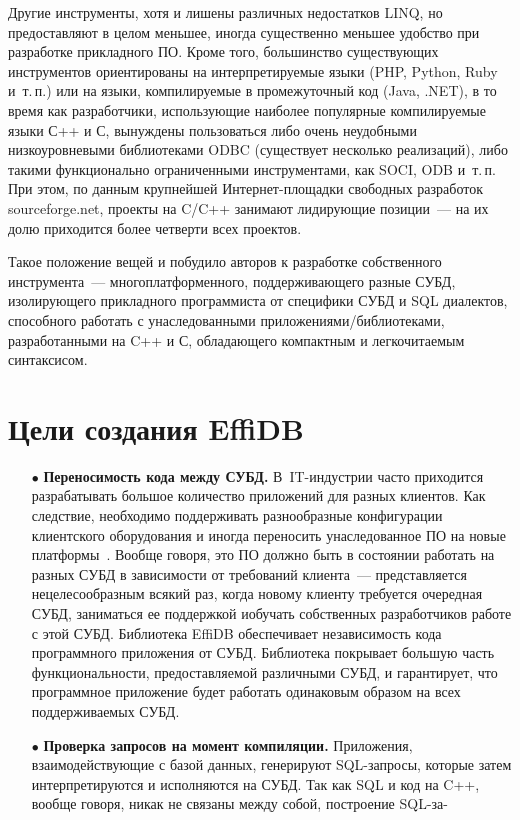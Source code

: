 \begin{multicols}{2}
Другие инструменты, хотя и лишены различных недостатков LINQ, но предоставляют в 
целом меньшее, иногда существенно меньшее удобство при разработке прикладного ПО. 
Кроме того, большинство существующих инструментов ориентированы на 
интерпретируемые языки (PHP, Python, Ruby и~т.\,п.) или на языки, компилируемые в 
промежуточный код (Java, .NET), в то время как разработчики, использующие наиболее 
популярные компилируемые языки С++ и С, вынуждены пользоваться либо очень 
неудобными низкоуровневыми библиотеками ODBC (существует несколько реализаций), 
либо такими функционально ограниченными инструментами, как SOCI, ODB и~т.\,п. При 
этом, по данным крупнейшей Интернет-площадки свободных разработок sourceforge.net, 
проекты на C/C++ занимают лидирующие позиции~--- на их долю приходится более 
четверти всех проектов.

Такое положение вещей и побудило авторов к разработке собственного инструмента~--- 
многоплатформенного, поддерживающего разные СУБД, изолирующего прикладного 
программиста от специфики СУБД и SQL диалектов, способного работать с 
унаследованными приложениями/библиотеками, разработанными на C++ и С, 
обладающего компактным и легкочитаемым синтаксисом. 

\vspace*{-9pt}

\section{Цели создания EffiDB}

\vspace*{-2pt}

\noindent
\begin{itemize}
\item[$\bullet$] \textbf{Переносимость кода между СУБД.} В~IT-ин\-ду\-ст\-рии 
часто приходится разрабатывать большое количество приложений для разных 
клиентов. Как следствие, необходимо поддерживать разнообразные конфигурации 
клиентского оборудования и иногда переносить унаследованное 
ПО на новые платформы~\cite{1-y, 2-y}. Вообще говоря, это 
ПО должно быть в состоянии работать на\linebreak
 разных СУБД в зависимости от 
требований клиента~--- представляется нецелесообразным всякий раз, когда новому 
клиенту требуется очередная СУБД, заниматься ее поддержкой и\linebreak \mbox{обучать} собственных 
разработчиков работе с этой СУБД. Библиотека EffiDB обес\-пе\-чивает независимость 
кода программного приложения от СУБД. Библиотека покрывает\linebreak
 большую часть 
функциональности, пред\-остав\-ля\-емой различными СУБД, и гарантирует, что 
про\-грам\-мное приложение будет работать одинаковым образом на всех 
поддерживаемых СУБД.
\item[$\bullet$] \textbf{Проверка запросов на момент компиляции.} Приложения, 
взаимодействующие с базой данных, генерируют SQL-за\-про\-сы, которые затем 
интерпретируются и исполняются на СУБД. Так как SQL и код на C++, вообще говоря, 
никак не связаны между собой, построение SQL-за-\linebreak\vspace*{-12pt}
\pagebreak


\end{itemize}
\end{multicols}
